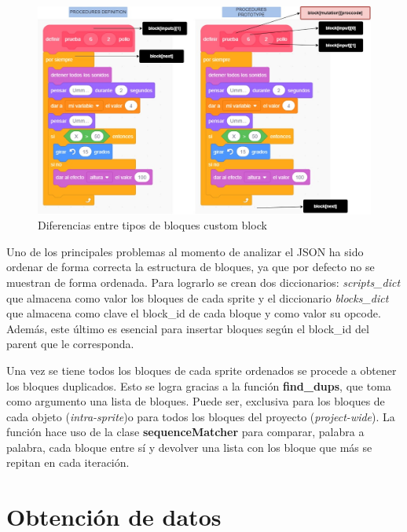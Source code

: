 \documentclass[a4paper, 12pt]{book}
\begin{document}
\begin{figure}[!htb]
  \centering
  \includegraphics[width=14cm, keepaspectratio]{img/scratch_custom.jpg}
  \caption{Diferencias entre tipos de bloques custom block}
  \label{fig:differences}
\end{figure}

\newpage 
Uno de los principales problemas al momento de analizar el JSON ha sido ordenar de forma correcta la estructura de bloques, ya que por defecto no se muestran de forma ordenada. Para lograrlo se crean dos diccionarios: \textit{scripts\_dict} que almacena como valor los bloques de cada sprite y el diccionario \textit{blocks\_dict} que almacena como clave el block\_id de cada bloque y como valor su opcode. Además, este último es esencial para insertar bloques según el block\_id del parent que le corresponda.

Una vez se tiene todos los bloques de cada sprite ordenados se procede a obtener los bloques duplicados. Esto se logra gracias a la función \textbf{find\_dups}, que toma como argumento una lista de bloques. Puede ser, exclusiva para los bloques de cada objeto (\textit{intra-sprite})o para todos los bloques del proyecto (\textit{project-wide}). La función hace uso de la clase \textbf{sequenceMatcher} para comparar, palabra a palabra, cada bloque entre sí y devolver una lista con los bloque que más se repitan en cada iteración. 


\section{Obtención de datos} 
\label{sec:obtenciondatos}
\end{document}
